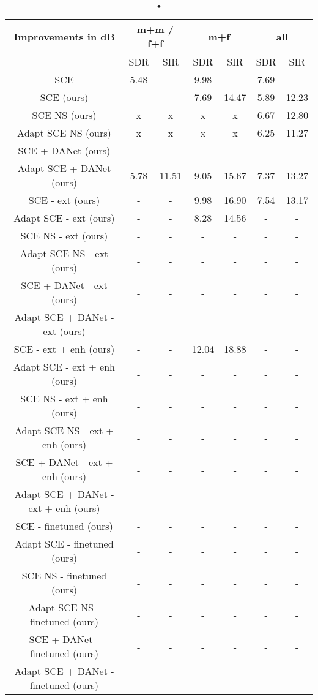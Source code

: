 \documentclass[master,final,11pt]{iscs-thesis}
\begin{document}
\begin{table}[h]
\begin{tabular}{c|c|c|c|c|c|c}
Improvements in dB & \multicolumn{2}{c|}{m+m / f+f} & \multicolumn{2}{c|}{m+f} & \multicolumn{2}{c}{all} \\ 
\hline 
 & SDR & SIR & SDR & SIR & SDR & SIR \\ 
\hline 
SCE \cite{SCE} & 5.48 & - & 9.98 & - & 7.69 & - \\ 
\hline 
SCE (ours) & - & - & 7.69 & 14.47 & 5.89 & 12.23 \\ 
\hline 
SCE NS (ours) & x & x & x & x & 6.67 & 12.80 \\
\hline 
Adapt SCE NS (ours) & x & x & x & x & 6.25 & 11.27 \\ 
\hline 
SCE + DANet (ours) & - & - & - & - & - & - \\ 
\hline 
Adapt SCE + DANet (ours) & 5.78 & 11.51 & 9.05 & 15.67 & 7.37 & 13.27 \\ 
\hline 
\hline 
SCE - ext (ours) & - & - & 9.98 & 16.90 & 7.54 & 13.17 \\ 
\hline 
Adapt SCE - ext (ours) & - & - & 8.28 & 14.56 & - & - \\ 
\hline 
SCE NS - ext (ours) & - & - & - & - & - & - \\
\hline 
Adapt SCE NS - ext (ours) & - & - & - & - & - & - \\ 
\hline 
SCE + DANet - ext (ours) & - & - & - & - & - & - \\ 
\hline 
Adapt SCE + DANet - ext (ours) & - & - & - & - & - & - \\ 
\hline
\hline 
SCE - ext + enh (ours) & - & - & 12.04 & 18.88 & - & - \\ 
\hline 
Adapt SCE - ext + enh (ours) & - & - & - & - & - & - \\ 
\hline 
SCE NS - ext + enh (ours) & - & - & - & - & - & - \\
\hline 
Adapt SCE NS - ext + enh (ours) & - & - & - & - & - & - \\ 
\hline 
SCE + DANet - ext + enh (ours)& - & - & - & - & - & - \\ 
\hline 
Adapt SCE + DANet - ext + enh (ours) & - & - & - & - & - & - \\ 
\hline 
\hline 
SCE - finetuned (ours) & - & - & - & - & - & - \\ 
\hline 
Adapt SCE - finetuned (ours) & - & - & - & - & - & - \\ 
\hline 
SCE NS - finetuned (ours) & - & - & - & - & - & - \\
\hline 
Adapt SCE NS - finetuned (ours) & - & - & - & - & - & - \\ 
\hline 
SCE + DANet - finetuned (ours) & - & - & - & - & - & - \\ 
\hline 
Adapt SCE + DANet - finetuned (ours) & - & - & - & - & - & - \\ 
\end{tabular}
\caption{•}
\end{table}
\end{document}
